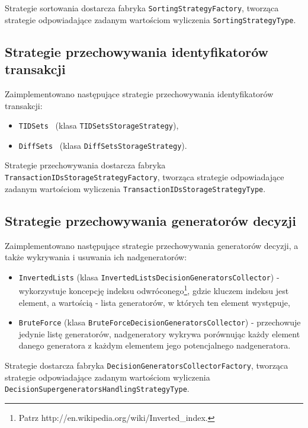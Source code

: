 \documentclass[a4paper,10pt]{article}
\begin{document}
 Strategie sortowania dostarcza fabryka \verb+SortingStrategyFactory+, tworząca strategie odpowiadające zadanym wartościom wyliczenia \verb+SortingStrategyType+.

 
 \subsection{Strategie przechowywania identyfikatorów transakcji} \label{sec:impl:store}
 Zaimplementowano następujące strategie przechowywania identyfikatorów transakcji:
 
 \begin{itemize}
  \item \verb+TIDSets+~\cite{charm} (klasa \verb+TIDSetsStorageStrategy+),
  \item \verb+DiffSets+~\cite{grm} (klasa \verb+DiffSetsStorageStrategy+).
 \end{itemize}

 Strategie przechowywania dostarcza fabryka \verb+TransactionIDsStorageStrategyFactory+, tworząca strategie odpowiadające zadanym wartościom wyliczenia \verb+TransactionIDsStorageStrategyType+.

 
 \subsection{Strategie przechowywania generatorów decyzji} \label{sec:impl:supgen}
 Zaimplementowano następujące strategie przechowywania generatorów decyzji, a także wykrywania i usuwania ich nadgeneratorów:
 
 \begin{itemize}
  \item \verb+InvertedLists+ (klasa \verb+InvertedListsDecisionGeneratorsCollector+) - wykorzystuje koncepcję indeksu odwróconego\footnote{Patrz http://en.wikipedia.org/wiki/Inverted\_index.}, gdzie kluczem indeksu jest element, a wartością - lista generatorów, w których ten element występuje,
  \item \verb+BruteForce+ (klasa \verb+BruteForceDecisionGeneratorsCollector+) - przechowuje jedynie listę generatorów, nadgeneratory wykrywa porównując każdy element danego generatora z każdym elementem jego potencjalnego nadgeneratora.
 \end{itemize}
 
 Strategie dostarcza fabryka \verb+DecisionGeneratorsCollectorFactory+, tworząca strategie odpowiadające zadanym wartościom wyliczenia \verb+DecisionSupergeneratorsHandlingStrategyType+.
 
\end{document}
